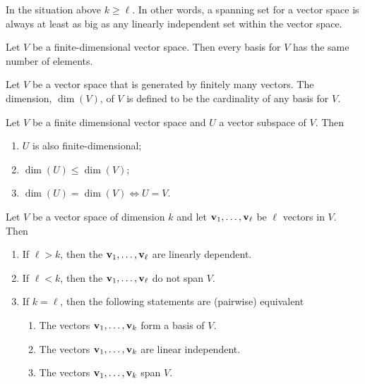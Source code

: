 \documentclass[10pt, a4paper]{article}
\begin{document}
\begin{corollary}
    In the situation above $k \geq \ell$.
    In other words,
    a spanning set for a vector space is always at least as big as any linearly independent set within the vector space.
\end{corollary}

\begin{corollary}
    Let $V$ be a finite-dimensional vector space.
    Then every basis for $V$ has the same number of elements.
\end{corollary}

\begin{definition}[Dimension]
    Let $V$ be a vector space that is generated by finitely many vectors.
    The dimension,
    $\dim{(V)}$,
    of $V$ is defined to be the cardinality of any basis for $V$.
\end{definition}

\begin{theorem}
    Let $V$ be a finite dimensional vector space and $U$ a vector subspace of $V$.
    Then
    \begin{enumerate}[label = (\roman*)]
        \item $U$ is also finite-dimensional;
        \item $\dim{(U)} \leq \dim{(V)}$;
        \item $\dim{(U)} = \dim{(V)} \iff U = V$.
    \end{enumerate}
\end{theorem}

\begin{theorem}
    Let $V$ be a vector space of dimension $k$ and let $\mathbf{v}_1, \dotsc, \mathbf{v}_{\ell}$ be $\ell$ vectors in $V$.
    Then
    \begin{enumerate}[label = (\roman*)]
        \item If $\ell > k$,
        then the $\mathbf{v}_1, \dotsc, \mathbf{v}_{\ell}$ are linearly dependent.
        \item If $\ell < k$,
        then the $\mathbf{v}_1, \dotsc, \mathbf{v}_{\ell}$ do not span $V$.
        \item If $k = \ell$,
        then the following statements are (pairwise) equivalent
        \begin{enumerate}[label = (\alph*)]
            \item The vectors $\mathbf{v}_1, \dotsc, \mathbf{v}_k$ form a basis of $V$.
            \item The vectors $\mathbf{v}_1, \dotsc, \mathbf{v}_k$ are linear independent.
            \item The vectors $\mathbf{v}_1, \dotsc, \mathbf{v}_k$ span $V$.
        \end{enumerate}
    \end{enumerate}
\end{theorem}
\end{document}
